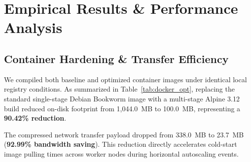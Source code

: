 \documentclass[conference]{IEEEtran}
\begin{document}
\section{Empirical Results \& Performance Analysis}

\subsection{Container Hardening \& Transfer Efficiency}
We compiled both baseline and optimized container images under identical local registry conditions. As summarized in Table~\ref{tab:docker_opt}, replacing the standard single-stage Debian Bookworm image with a multi-stage Alpine 3.12 build reduced on-disk footprint from 1,044.0~MB to 100.0~MB, representing a \textbf{90.42\% reduction}.

\begin{table}[htbp]
\centering
\caption{Docker Image Optimization Comparison}
\label{tab:docker_opt}
\end{table}

The compressed network transfer payload dropped from 338.0~MB to 23.7~MB (\textbf{92.99\% bandwidth saving}). This reduction directly accelerates cold-start image pulling times across worker nodes during horizontal autoscaling events.
\end{document}
